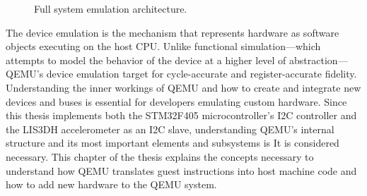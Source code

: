 \begin{figure}[htbp]
    \centering
    \caption{Full system emulation architecture.}
    \label{fig:full_system_emulation}
\end{figure}

The device emulation is the mechanism that represents hardware as software 
objects executing on the host CPU. Unlike functional simulation—which attempts to 
model the behavior of the device at a higher level of abstraction—QEMU's device 
emulation target for cycle-accurate and register-accurate fidelity. Understanding 
the inner workings of QEMU and how to create and integrate new devices and 
buses is essential for developers emulating custom hardware. Since this thesis 
implements both the STM32F405 microcontroller's I2C controller and the LIS3DH 
accelerometer as an I2C slave, understanding QEMU's internal structure and its 
most important elements and subsystems is It is considered necessary. This chapter 
of the thesis explains the concepts necessary to understand how QEMU translates 
guest instructions into host machine code and how to add new hardware to the 
QEMU system.



